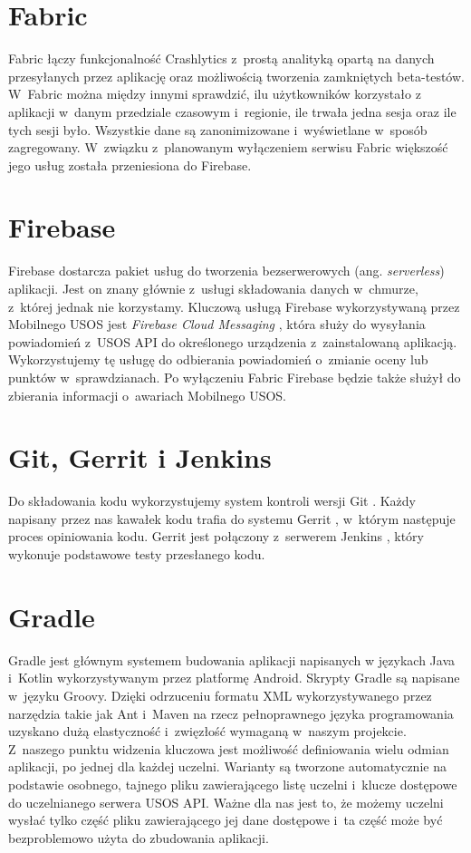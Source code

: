 \documentclass{pracamgr}
\begin{document}
\section{Fabric}

Fabric \cite{fabric} łączy funkcjonalność Crashlytics z~prostą analityką opartą na
danych przesyłanych przez aplikację oraz możliwością tworzenia zamkniętych
beta-testów. W~Fabric można między innymi sprawdzić, ilu użytkowników korzystało
z aplikacji w~danym przedziale czasowym i~regionie, ile trwała jedna sesja oraz
ile tych sesji było. Wszystkie dane są zanonimizowane i~wyświetlane w~sposób
zagregowany. W~związku z~planowanym wyłączeniem serwisu Fabric większość jego
usług została przeniesiona do Firebase.

\section{Firebase}

Firebase \cite{firebase} dostarcza pakiet usług do tworzenia bezserwerowych
(ang. \textit{serverless}) aplikacji. Jest on znany głównie z~usługi składowania
danych w~chmurze, z~której jednak nie korzystamy. Kluczową usługą Firebase
wykorzystywaną przez Mobilnego USOS jest \textit{Firebase Cloud Messaging}
\cite{firebasecm}, która służy do wysyłania powiadomień z~USOS API do określonego
urządzenia z~zainstalowaną aplikacją. Wykorzystujemy tę usługę do odbierania
powiadomień o~zmianie oceny lub punktów w~sprawdzianach. Po wyłączeniu Fabric
Firebase będzie także służył do zbierania informacji o~awariach Mobilnego USOS.

\section{Git, Gerrit i Jenkins}

Do składowania kodu wykorzystujemy system kontroli wersji Git \cite{git}. Każdy
napisany przez nas kawałek kodu trafia do systemu Gerrit \cite{gerrit}, w~którym
następuje proces opiniowania kodu. Gerrit jest połączony z~serwerem Jenkins
\cite{jenkins}, który wykonuje podstawowe testy przesłanego kodu.

\section{Gradle}

Gradle \cite{gradle} jest głównym systemem budowania aplikacji napisanych w
językach Java i~Kotlin wykorzystywanym przez platformę Android. Skrypty Gradle
są napisane w~języku Groovy. Dzięki odrzuceniu formatu XML wykorzystywanego przez
narzędzia takie jak Ant i~Maven na rzecz pełnoprawnego języka programowania
uzyskano dużą elastyczność i~zwięzłość wymaganą w~naszym projekcie. Z~naszego
punktu widzenia kluczowa jest możliwość definiowania wielu odmian aplikacji, po
jednej dla każdej uczelni. Warianty są tworzone automatycznie na podstawie osobnego,
tajnego pliku zawierającego listę uczelni i~klucze dostępowe do uczelnianego serwera
USOS API. Ważne dla nas jest to, że możemy uczelni wysłać tylko część pliku zawierającego
jej dane dostępowe i~ta część może być bezproblemowo użyta do zbudowania aplikacji.
\end{document}
